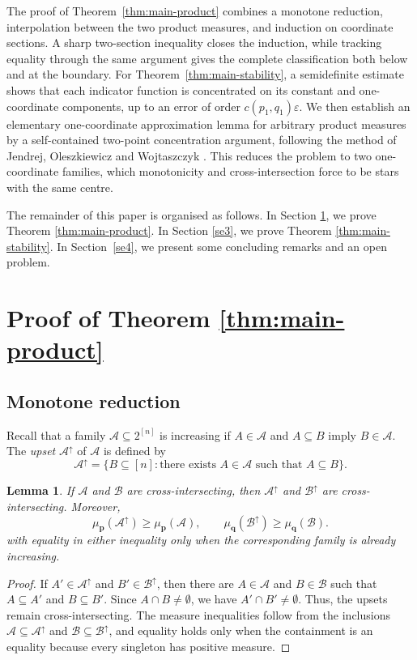 \documentclass[11pt]{article}
\numberwithin{equation}{section}
\newtheorem{lemma}[theorem]{Lemma}
\theoremstyle{definition}
\theoremstyle{remark}
\newcommand{\up}{\uparrow}
\begin{document}
\medskip
The proof of Theorem~\ref{thm:main-product} combines a monotone
reduction, interpolation between the two product measures, and induction
on coordinate sections. A sharp two-section inequality closes the
induction, while tracking equality through the same argument gives the
complete classification both below and at the boundary.
 For Theorem~\ref{thm:main-stability}, a semidefinite estimate shows that each indicator
function is concentrated on its constant and one-coordinate components,
up to an error of order $c(p_1,q_1)\varepsilon$. We then establish an
elementary one-coordinate approximation lemma for arbitrary product
measures by a self-contained two-point concentration argument, following
the method of Jendrej, Oleszkiewicz and Wojtaszczyk
\cite{JendrejOleszkiewiczWojtaszczyk}. This reduces the problem to two
one-coordinate families, which monotonicity and cross-intersection force
to be stars with the same centre.





The remainder of this paper is organised as follows. In Section \ref{se2}, we prove Theorem  \ref{thm:main-product}.  In Section  \ref{se3}, we prove Theorem \ref{thm:main-stability}. In Section~\ref{se4}, we
present some concluding remarks and an open problem.



\section{Proof of Theorem  \ref{thm:main-product}}\label{se2}

\subsection{Monotone reduction}


Recall that a family $\mathcal{A}\subseteq2^{[n]}$ is  increasing if $A\in\mathcal{A}$ and $A\subseteq B$ imply $B\in\mathcal{A}$.  The \textit{upset} $\mathcal A^\uparrow$ of $\mathcal{A}$ is  defined by
$$
\mathcal{A}^\uparrow=\{B\subseteq[n]:\text{there exists }A\in\mathcal{A}\text{ such that }A\subseteq B\}.
$$
\begin{lemma}\label{lem:upclosure}
If $\mathcal{A}$ and $\mathcal{B}$ are cross-intersecting, then $\mathcal{A}^{\up}$ and $\mathcal{B}^{\up}$ are cross-intersecting. Moreover,
$$
 \mu_{\mathbf p}(\mathcal{A}^{\up})\geq\mu_{\mathbf p}(\mathcal{A}),
 \qquad
 \mu_{\mathbf q}(\mathcal{B}^{\up})\geq\mu_{\mathbf q}(\mathcal{B}).
$$
with equality in either inequality only when the corresponding family is already increasing.
\end{lemma}
\begin{proof}
If $A'\in\mathcal{A}^{\up}$ and $B'\in\mathcal{B}^{\up}$, then there are $A\in\mathcal{A}$ and $B\in\mathcal{B}$ such that $A\subseteq A'$ and $B\subseteq B'$. Since $A\cap B\neq\emptyset$, we  have $A'\cap B'\neq\emptyset$. Thus, the upsets remain cross-intersecting. The measure inequalities follow from the inclusions $\mathcal{A}\subseteq\mathcal{A}^{\up}$ and $\mathcal{B}\subseteq\mathcal{B}^{\up}$, and equality holds only when the containment is an equality because every singleton has positive measure.
\end{proof}
\end{document}

